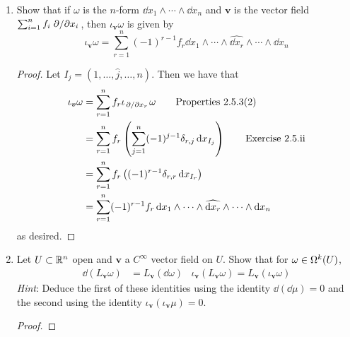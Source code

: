 \documentclass[../psets.tex]{subfiles}
\begin{document}
\begin{enumerate}[label={\textbf{2.5.\roman*.}}]
\begin{proof}
        \begin{align*}
            \iota_{\bm{v}}\omega &= \sum_{j=1}^k(-1)^{j-1}\iota_{\bm{v}}(\dd{x_{i_j}})\dd{x_{i_1}}\wedge\cdots\wedge\widehat{\dd{x_{i_j}}}\wedge\cdots\wedge\dd{x_{i_k}}\\
            &= \sum_{j=1}^k(-1)^{j-1}\dd{x_{i_j}}(\pdv*{x_r})\dd{x_{i_1}}\wedge\cdots\wedge\widehat{\dd{x_{i_j}}}\wedge\cdots\wedge\dd{x_{i_k}}\\
            &= \sum_{j=1}^k(-1)^{j-1}\delta_{r,i_j}\dd{x_{I_j}}
        \end{align*}
        as desired.
    \end{proof}
    \item Show that if $\omega$ is the $n$-form $\dd{x_1}\wedge\cdots\wedge\dd{x_n}$ and $\bm{v}$ is the vector field $\sum_{i=1}^nf_i\pdv*{x_i}$, then $\iota_{\bm{v}}\omega$ is given by
    \begin{equation*}
        \iota_{\bm{v}}\omega = \sum_{r=1}^n(-1)^{r-1}f_r\dd{x_1}\wedge\cdots\wedge\widehat{\dd{x_r}}\wedge\cdots\wedge\dd{x_n}
    \end{equation*}
    \begin{proof}
        Let $I_j=(1,\dots,\hat{j},\dots,n)$. Then we have that
        \begin{align*}
            \iota_{\bm{v}}\omega &= \sum_{r=1}^nf_r\iota_{\pdv*{x_r}}\omega\tag*{Properties 2.5.3(2)}\\
            &= \sum_{r=1}^nf_r\left( \sum_{j=1}^n(-1)^{j-1}\delta_{r,j}\dd{x_{I_j}} \right)\tag*{Exercise 2.5.ii}\\
            &= \sum_{r=1}^nf_r\left( (-1)^{r-1}\delta_{r,r}\dd{x_{I_r}} \right)\\
            &= \sum_{r=1}^n(-1)^{r-1}f_r\dd{x_1}\wedge\cdots\wedge\widehat{\dd{x_r}}\wedge\cdots\wedge\dd{x_n}
        \end{align*}
        as desired.
    \end{proof}
    \item Let $U\subset\R^n$ open and $\bm{v}$ a $C^\infty$ vector field on $U$. Show that for $\omega\in\ome[k]{U}$,
    \begin{align*}
        \dd(L_{\bm{v}}\omega) &= L_{\bm{v}}(\dd\omega)&
        \iota_{\bm{v}}(L_{\bm{v}}\omega) = L_{\bm{v}}(\iota_{\bm{v}}\omega)
    \end{align*}
    \emph{Hint}: Deduce the first of these identities using the identity $\dd(\dd\mu)=0$ and the second using the identity $\iota_{\bm{v}}(\iota_{\bm{v}}\mu)=0$.
    \begin{proof}

\end{proof}
\end{enumerate}
\end{document}
